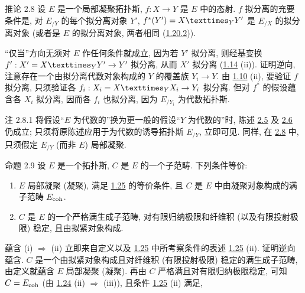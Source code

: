 \begin{enonce*}{推论 2.8}
设 $E$ 是一个局部凝聚拓扑斯,
$f:X\to Y$ 是 $E$ 中的态射.
$f$ 拟分离的充要条件是,
对 $E_{/Y}$ 的每个拟分离对象 $Y'$,
$f^{\ast}(Y')=\fprod{X}{Y'}{Y}$
是 $E_{/X}$ 的拟分离对象
(或者是 $E$ 的拟分离对象, 两者相同
(\hyperref[VI.subsubsec1.20.2]{1.20.2})).
\end{enonce*}

“仅当”\pageoriginale{}方向无须对 $E$ 作任何条件就成立,
因为若 $Y'$ 拟分离,
则经基变换 $f':X'=\fprod{X}{Y'}{Y}\to Y'$ 拟分离,
从而 $X'$ 拟分离 (\hyperref[VI.prop1.14]{1.14} (ii)).
证明逆向, 注意存在一个由拟分离代数对象构成的 $Y$ 的覆盖族 $Y_i\to Y$.
由 \hyperref[VI.prop1.10]{1.10} (ii),
要验证 $f$ 拟分离, 只须验证各
$f_i:X_i=\fprod{X}{X_i}{Y}\to Y_i$ 拟分离.
但对 $f^{\ast}$ 的假设蕴含各 $X_i$ 拟分离,
因而各 $f_i$ 也拟分离,
因为 $E_{/Y_i}$ 为代数拓扑斯.

\begin{enonce*}[remark]{注 2.8.1}
将假设“$E$ 为代数的”换为更一般的假设“$Y$ 为代数的”时,
陈述 \hyperref[VI.prop2.5]{2.5} 及 \hyperref[VI.cor2.6]{2.6} 仍成立;
只须将原陈述应用于为代数的诱导拓扑斯 $E_{/Y}$, 立即可见.
同样, 在 \hyperref[VI.cor2.8]{2.8} 中,
只须假定 $E_{/Y}$ (而非 $E$) 局部凝聚.
\end{enonce*}

\begin{enonce*}{命题 2.9}
设 $E$ 是一个拓扑斯, $C$ 是 $E$ 的一个子范畴.
下列条件等价:
\begin{enumerate}
\renewcommand{\theenumi}{\roman{enumi}}
\renewcommand{\labelenumi}{(\theenumi)}
\item $E$ 局部凝聚 (\resp 凝聚),
满足 \hyperref[VI.cor1.25]{1.25} 的等价条件,
且 $C$ 是 $E$ 中由凝聚对象构成的满子范畴 $E_{\mathrm{coh}}$.

\item $C$ 是 $E$ 的一个严格满生成子范畴,
对有限归纳极限和纤维积
(\resp 以及有限投射极限) 稳定,
且由拟紧对象构成.
\end{enumerate}
\end{enonce*}

蕴含\pageoriginale{} (i) $\Rightarrow$ (ii)
立即来自定义以及 \hyperref[VI.cor1.25]{1.25} 中所考察条件的表述
\hyperref[VI.cor1.25]{1.25} (ii).
证明逆向蕴含.
$C$ 是一个由拟紧对象构成且对纤维积
(\resp 有限投射极限) 稳定的满生成子范畴,
由定义就蕴含 $E$ 局部凝聚 (\resp 凝聚).
再由 $C$ 严格满且对有限归纳极限稳定,
可知 $C=E_{\mathrm{coh}}$
(由 \hyperref[VI.cor1.24]{1.24} (ii) $\Rightarrow$ (iii)),
且条件 \hyperref[VI.cor1.25]{1.25} (ii) 满足, \cqfd

